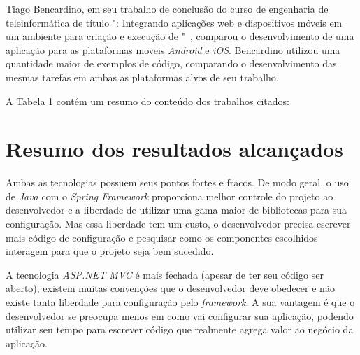 Tiago Bencardino, em seu trabalho de conclusão do curso de engenharia de teleinformática de título ": Integrando aplicações web e dispositivos móveis em um ambiente para criação e execução de "~\cite{16}, 
comparou o desenvolvimento de uma aplicação para as plataformas moveis \textit{Android} e \textit{iOS}. Bencardino utilizou uma quantidade maior de exemplos de código, comparando o desenvolvimento das mesmas tarefas em ambas as plataformas alvos de seu trabalho.

A Tabela 1 contém um resumo do conteúdo dos trabalhos citados:

\begin{table}[h!]   
    \centering
\end{table}

\section{Resumo dos resultados alcançados}
\label{sec:resumoresultados}

Ambas as tecnologias possuem seus pontos fortes e fracos. De modo geral, o uso de \textit{Java} com o \textit{Spring Framework} proporciona melhor controle do projeto ao desenvolvedor e a liberdade de utilizar uma gama maior de bibliotecas para sua configuração. 
Mas essa liberdade tem um custo, o desenvolvedor precisa escrever mais código de configuração e pesquisar como os componentes escolhidos interagem para que o projeto seja bem sucedido.

A tecnologia \textit{ASP.NET MVC} é mais fechada (apesar de ter seu código ser aberto), existem muitas convenções que o desenvolvedor deve obedecer e não existe tanta liberdade para configuração pelo \textit{framework}. 
A sua vantagem é que o desenvolvedor se preocupa menos em como vai configurar sua aplicação, podendo utilizar seu tempo para escrever código que realmente agrega valor ao negócio da aplicação.

